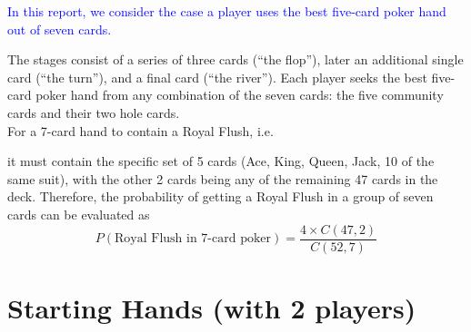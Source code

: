 \documentclass{article}
\begin{document}
\begin{center}
    \textcolor{blue}{
        In this report, we consider the case a player uses the best 
        five-card poker hand out of seven cards.
    }
\end{center}
The stages consist of a series of three cards (``the flop''), later an 
additional single card (``the turn''), and a final card (``the river''). 
Each player seeks the best five-card poker hand from any combination of 
the seven cards: the five community cards and their two hole cards.
\vspace*{5mm}\\
For a 7-card hand to contain a Royal Flush, i.e.
\begin{center}
\end{center}
it must contain the specific set of 5 cards 
(Ace, King, Queen, Jack, 10 of the same suit), 
with the other 2 cards being any of the remaining 47 cards in the deck. 
Therefore, the probability of getting a Royal Flush in a group of seven 
cards can be evaluated as 
\[
P(\text{Royal Flush in 7-card poker}) = \frac{4 \times C(47, 2)}{C(52, 7)}
\]

\newpage

\section*{Starting Hands (with 2 players)}
\end{document}
